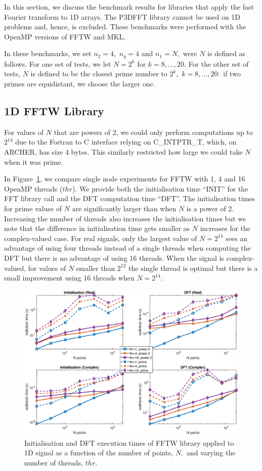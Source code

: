 \documentclass[a4paper]{article}
\begin{document}
In this section, we discuss the benchmark results for libraries that
apply the fast Fourier transform to 1D arrays.  The P3DFFT library
cannot be used on 1D problems and, hence, is excluded. These
benchmarks were performed with the OpenMP versions of FFTW and MKL.

In these benchmarks, we set $n_2=4,$ $n_q=4$ and $n_1=N,$ were $N$ is
defined as follows.  For one set of tests, we let $N=2^k$ for
$k=8,\ldots,20.$ For the other set of tests, $N$ is defined to be the
closest prime number to $2^k,$ $k=8,\ldots,20:$ if two primes are
equidistant, we choose the larger one.


\subsection{1D FFTW Library}\label{Sec:1DFFTW}
For values of $N$ that are powers of 2, we could only perform
computations up to $2^{14}$ due to the Fortran to C interface relying on
C\_INTPTR\_T, which, on ARCHER, has size 4 bytes. This similarly
restricted how large we could take $N$ when it was prime.

In Figure~\ref{1DFFTW}, we compare single node experiments for FFTW
with 1, 4 and 16 OpenMP threads ($thr$). We provide both the initialisation
time ``INIT'' for the FFT library call and the DFT computation time
``DFT''.  The initialisation times for prime values of $N$ are
significantly larger than when $N$ is a power of 2. Increasing the
number of threads also increases the initialisation times but we note
that the difference in initialisation time gets smaller as $N$
increases for the complex-valued case. For real signals, only the
largest value of $N=2^{14}$ sees an advantage of using four threads
instead of a single threads when computing the DFT but there is no
advantage of using 16 threads. When the signal is complex-valued, for
values of $N$ smaller than $2^{12}$ the single thread is optimal but
there is a small improvement using 16 threads when $N=2^{14}$.


\begin{figure}[!htb]
    \centering
    \includegraphics[width=0.9\linewidth]{../results/fftw_1d_thr.eps}
  \caption{Initialisation and DFT execution times of FFTW library applied to 1D signal as a function of the
    number of points, $N,$ and varying the number of threads, $thr.$ }
  \label{1DFFTW}
\end{figure}
\end{document}
